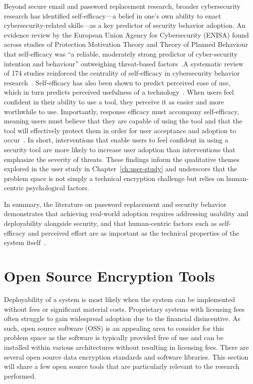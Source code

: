 Beyond secure email and password replacement research, broader cybersecurity research has identified self-efficacy---a belief in one's own ability to enact cybersecurity-related skills---as a key predictor of security behavior adoption. An evidence review by the European Union Agency for Cybersecurity (ENISA) found across studies of Protection Motivation Theory and Theory of Planned Behaviour that self-efficacy was ``a reliable, moderately strong predictor of cyber-security intention and behaviour'' outweighing threat-based factors~\cite{enisa_cybersecurity_2019}.\@ A systematic review of 174 studies reinforced the centrality of self-efficacy in cybersecurity behavior research~\cite{borgert_systematic_2024}. Self-efficacy has also been shown to predict perceived ease of use, which in turn predicts perceived usefulness of a technology~\cite{zhang_self_efficacy_2017}. When users feel confident in their ability to use a tool, they perceive it as easier and more worthwhile to use. Importantly, response efficacy must accompany self-efficacy, meaning users must believe that they are capable of using the tool and that the tool will effectively protect them in order for user acceptance and adoption to occur~\cite{enisa_cybersecurity_2019}. In short, interventions that enable users to feel confident in using a security tool are more likely to increase user adoption than interventions that emphasize the severity of threats. These findings inform the qualitative themes explored in the user study in Chapter~\ref{ch:user-study} and underscore that the problem space is not simply a technical encryption challenge but relies on human-centric psychological factors.

In summary, the literature on password replacement and security behavior demonstrates that achieving real-world adoption requires addressing usability and deployability alongside security, and that human-centric factors such as self-efficacy and perceived effort are as important as the technical properties of the system itself~\cite{bonneau_quest_2012}.

\section{Open Source Encryption Tools}
\label{sec:oss-tools}

Deployability of a system is most likely when the system can be implemented without fees or significant material costs. Proprietary systems with licensing fees often struggle to gain widespread adoption due to the financial disincentive. As such, open source software (OSS) is an appealing area to consider for this problem space as the software is typically provided free of use and can be installed within various architectures without resulting in licensing fees. There are several open source data encryption standards and software libraries. This section will share a few open source tools that are particularly relevant to the research performed.

